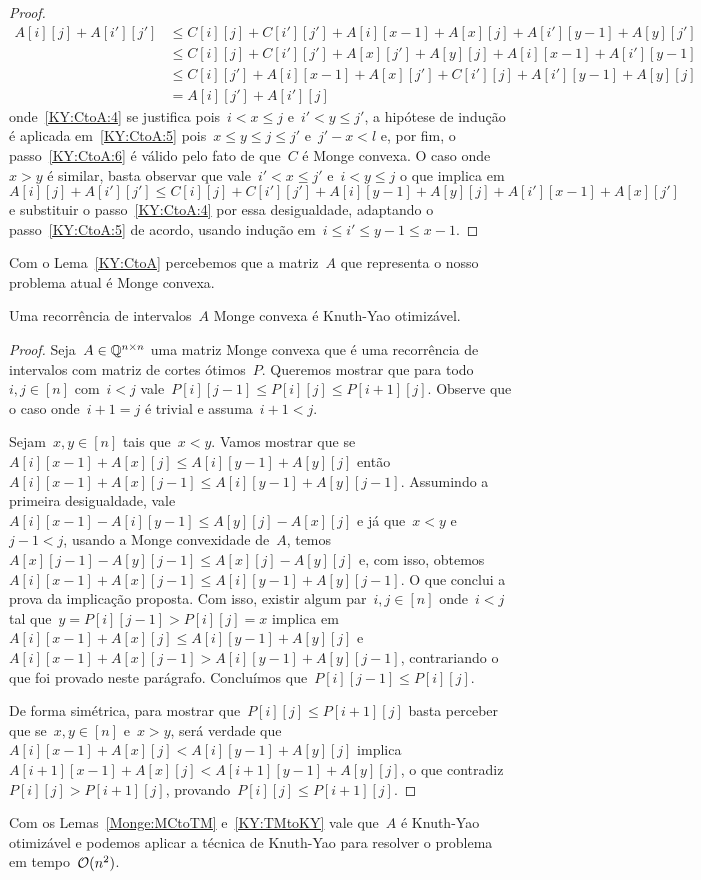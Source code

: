 \begin{proof}
\begin{align}
A[i][j] + A[i'][j'] &\leq C[i][j] + C[i'][j'] + A[i][x-1] + A[x][j] + A[i'][y-1] + A[y][j'] \label{KY:CtoA:4} \\
                    &\leq C[i][j] + C[i'][j'] + A[x][j'] + A[y][j] + A[i][x-1] + A[i'][y-1] \label{KY:CtoA:5} \\
                    &\leq C[i][j'] + A[i][x-1] + A[x][j'] + C[i'][j] + A[i'][y-1] + A[y][j] \label{KY:CtoA:6} \\
                    &= A[i][j'] + A[i'][j] \nonumber
\end{align}
onde~\eqref{KY:CtoA:4} se justifica pois~${i < x \leq j}$ e~${i' < y \leq j'}$, a hipótese de indução é aplicada em~\eqref{KY:CtoA:5} pois~${x \leq y \leq j \leq j'}$ e~${j' - x < l}$ e, por fim, o passo~\eqref{KY:CtoA:6} é válido pelo fato de que~$C$ é Monge convexa. O caso onde~${x > y}$ é similar, basta observar que vale~${i' < x \leq j'}$ e~${i < y \leq j}$ o que implica em~${A[i][j] + A[i'][j'] \leq C[i][j] + C[i'][j'] + A[i][y-1] + A[y][j] + A[i'][x-1] + A[x][j']}$ e substituir o passo~\eqref{KY:CtoA:4} por essa desigualdade, adaptando o passo~\eqref{KY:CtoA:5} de acordo, usando indução em~${i \leq i' \leq y - 1 \leq x - 1}$.
\end{proof}

Com o Lema~\ref{KY:CtoA} percebemos que a matriz~$A$ que representa o nosso problema atual é Monge convexa.

\begin{lema} \label{KY:TMtoKY}
Uma recorrência de intervalos~$A$ Monge convexa é Knuth-Yao otimizável.
\end{lema}

\begin{proof}
Seja~$A \in \mathbb{Q}^{n \times n}$ uma matriz Monge convexa que é uma recorrência de intervalos com matriz de cortes ótimos~$P$. Queremos mostrar que para todo~$i,j \in [n]$ com~$i < j$ vale~${P[i][j-1] \leq P[i][j] \leq P[i+1][j]}$. Observe que o caso onde~${i + 1 = j}$ é trivial e assuma~${i + 1 < j}$.

Sejam~${x,y \in[n]}$ tais que~$x < y$. Vamos mostrar que se~${A[i][x-1] + A[x][j] \leq A[i][y-1] + A[y][j]}$ então~${A[i][x-1] + A[x][j-1] \leq A[i][y-1] + A[y][j-1]}$. Assumindo a primeira desigualdade, vale~${A[i][x-1] - A[i][y-1] \leq A[y][j] - A[x][j]}$ e já que~${x < y}$ e~${j-1 < j}$, usando a Monge convexidade de~$A$, temos~${A[x][j-1] - A[y][j-1] \leq A[x][j] - A[y][j]}$ e, com isso, obtemos~${A[i][x-1] + A[x][j-1] \leq A[i][y-1] + A[y][j-1]}$. O que conclui a prova da implicação proposta. Com isso, existir algum par~$i,j \in [n]$ onde~$i < j$ tal que~${y = P[i][j-1] > P[i][j] = x}$ implica em~${A[i][x-1] + A[x][j] \leq A[i][y-1] + A[y][j]}$ e~${A[i][x-1] + A[x][j-1] > A[i][y-1] + A[y][j-1]}$, contrariando o que foi provado neste parágrafo. Concluímos que~${P[i][j-1] \leq P[i][j]}$. 

De forma simétrica, para mostrar que~${P[i][j] \leq P[i+1][j]}$ basta perceber que se~${x,y \in [n]}$ e~${x > y}$, será verdade que~${A[i][x-1] + A[x][j] < A[i][y-1] + A[y][j]}$ implica~${A[i+1][x-1] + A[x][j] < A[i+1][y-1] + A[y][j]}$, o que contradiz~${P[i][j] > P[i+1][j]}$, provando~${P[i][j] \leq P[i+1][j]}$.
\end{proof}

Com os Lemas~\ref{Monge:MCtoTM} e~\ref{KY:TMtoKY} vale que~$A$ é Knuth-Yao otimizável e podemos aplicar a técnica de Knuth-Yao para resolver o problema em tempo~$\mathcal{O}(n^2)$.

